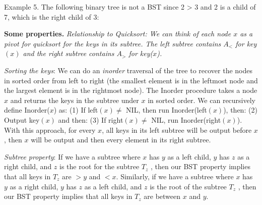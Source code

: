 \documentclass [12pt]{article}
\begin{document}
Example 5. The following binary tree is not a BST since 2 > 3 and 2 is a child of 7, which is the right child of 3:

\begin{center}
\end{center}


\textbf{Some properties.} \textit{Relationship to Quicksort: We can think of each node $x$ as a pivot for quicksort for the keys in its subtree. The left subtree contains $A_<$ for key$(x)$ and the right subtree contains $A_>$ for key($x$).}

\textit{Sorting the keys}: We can do an \textit{inorder} traversal of the tree to recover the nodes in sorted order from left to right (the smallest element is in the leftmost node and the largest element is in the rightmost node). The Inorder procedure takes a node $x$ and returns the keys in the subtree under $x$ in sorted order. We can recursively define Inorder($x$) as: (1) If left$(x) \neq$  NIL, then run Inorder(left$(x)$), then: (2) Output key$(x)$ and then: (3) If right$(x) \neq$ NIL, run Inorder(right$(x)$). With this approach, for every $x$, all keys in its left subtree will be output
before $x$, then $x$ will be output and then every element in its right subtree.

\textit{Subtree property}: If we have a subtree where $x$ has $y$ as a left child, $y$ has $z$ as a right child, and $z$ is the root for the subtree $T_z$ , then our BST property implies that all keys in $T_z$ are $> y $ and $< x$. Similarly, if we have a subtree where $x$ has $y$ as a right child, $y$ has $z$ as a left child, and $z$ is the root of the subtree $T_z$ , then our BST property implies that all keys in $T_z$ are between $x$ and $y$.
\end{document}

